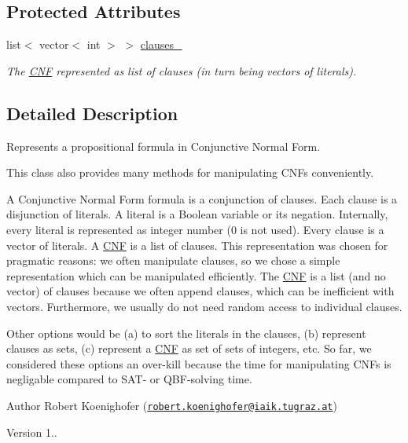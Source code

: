 \subsection*{Protected Attributes}
\begin{DoxyCompactItemize}
\item 
list$<$ vector$<$ int $>$ $>$ \hyperlink{classCNF_acc8cc195dc20d00c47d6a2282b45a612}{clauses\-\_\-}
\begin{DoxyCompactList}\small\item\em The \hyperlink{classCNF}{C\-N\-F} represented as list of clauses (in turn being vectors of literals). \end{DoxyCompactList}\end{DoxyCompactItemize}


\subsection{Detailed Description}
Represents a propositional formula in Conjunctive Normal Form. 

This class also provides many methods for manipulating C\-N\-Fs conveniently.

A Conjunctive Normal Form formula is a conjunction of clauses. Each clause is a disjunction of literals. A literal is a Boolean variable or its negation. Internally, every literal is represented as integer number (0 is not used). Every clause is a vector of literals. A \hyperlink{classCNF}{C\-N\-F} is a list of clauses. This representation was chosen for pragmatic reasons\-: we often manipulate clauses, so we chose a simple representation which can be manipulated efficiently. The \hyperlink{classCNF}{C\-N\-F} is a list (and no vector) of clauses because we often append clauses, which can be inefficient with vectors. Furthermore, we usually do not need random access to individual clauses.

Other options would be (a) to sort the literals in the clauses, (b) represent clauses as sets, (c) represent a \hyperlink{classCNF}{C\-N\-F} as set of sets of integers, etc. So far, we considered these options an over-\/kill because the time for manipulating C\-N\-Fs is negligable compared to S\-A\-T-\/ or Q\-B\-F-\/solving time.

\begin{DoxyAuthor}{Author}
Robert Koenighofer (\href{mailto:robert.koenighofer@iaik.tugraz.at}{\tt robert.\-koenighofer@iaik.\-tugraz.\-at}) 
\end{DoxyAuthor}
\begin{DoxyVersion}{Version}
1.. 
\end{DoxyVersion}


